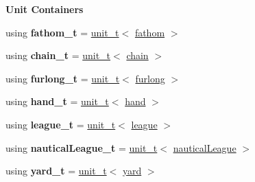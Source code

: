 \begin{Indent}{\bf Unit Containers}
\begin{DoxyCompactItemize}
\item 
\hypertarget{namespaceunits_1_1length_ab6257c4cc0308fcba38ce4b2f015409e}{}using {\bfseries fathom\+\_\+t} = \hyperlink{classunits_1_1unit__t}{unit\+\_\+t}$<$ \hyperlink{structunits_1_1unit}{fathom} $>$\label{namespaceunits_1_1length_ab6257c4cc0308fcba38ce4b2f015409e}

\item 
\hypertarget{namespaceunits_1_1length_a255f63c49df6d91699426d05cef063b6}{}using {\bfseries chain\+\_\+t} = \hyperlink{classunits_1_1unit__t}{unit\+\_\+t}$<$ \hyperlink{structunits_1_1unit}{chain} $>$\label{namespaceunits_1_1length_a255f63c49df6d91699426d05cef063b6}

\item 
\hypertarget{namespaceunits_1_1length_a6b9f5b0a3bcd7ef36f3c488fc4de87de}{}using {\bfseries furlong\+\_\+t} = \hyperlink{classunits_1_1unit__t}{unit\+\_\+t}$<$ \hyperlink{structunits_1_1unit}{furlong} $>$\label{namespaceunits_1_1length_a6b9f5b0a3bcd7ef36f3c488fc4de87de}

\item 
\hypertarget{namespaceunits_1_1length_a690a2e25fe6936a1ca08c2020df60996}{}using {\bfseries hand\+\_\+t} = \hyperlink{classunits_1_1unit__t}{unit\+\_\+t}$<$ \hyperlink{structunits_1_1unit}{hand} $>$\label{namespaceunits_1_1length_a690a2e25fe6936a1ca08c2020df60996}

\item 
\hypertarget{namespaceunits_1_1length_a85bff411e679a174c0928c845b547345}{}using {\bfseries league\+\_\+t} = \hyperlink{classunits_1_1unit__t}{unit\+\_\+t}$<$ \hyperlink{structunits_1_1unit}{league} $>$\label{namespaceunits_1_1length_a85bff411e679a174c0928c845b547345}

\item 
\hypertarget{namespaceunits_1_1length_a7810b46ebe7e100446f662c7d4966eaf}{}using {\bfseries nautical\+League\+\_\+t} = \hyperlink{classunits_1_1unit__t}{unit\+\_\+t}$<$ \hyperlink{structunits_1_1unit}{nautical\+League} $>$\label{namespaceunits_1_1length_a7810b46ebe7e100446f662c7d4966eaf}

\item 
\hypertarget{namespaceunits_1_1length_a588dfdc9fa3a858f8a4c50c1be6c40d2}{}using {\bfseries yard\+\_\+t} = \hyperlink{classunits_1_1unit__t}{unit\+\_\+t}$<$ \hyperlink{structunits_1_1unit}{yard} $>$\label{namespaceunits_1_1length_a588dfdc9fa3a858f8a4c50c1be6c40d2}

\end{DoxyCompactItemize}
\end{Indent}


